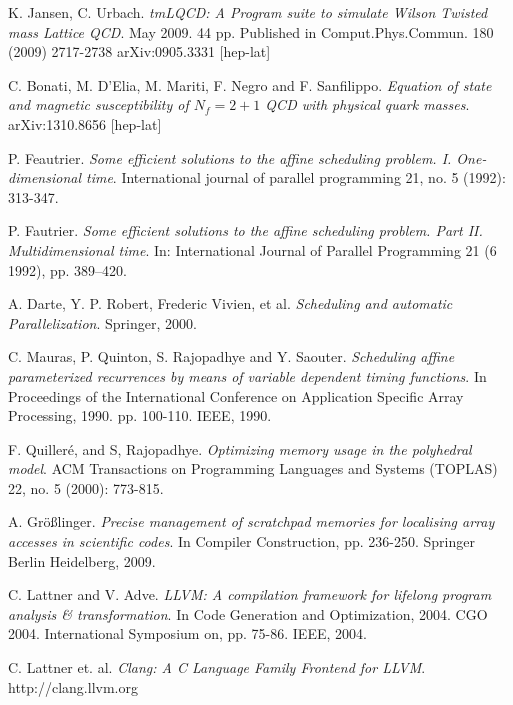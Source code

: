 \documentclass{sigplanconf}
\begin{document}

\begin{thebibliography}
\softraggedright


K. Jansen, C. Urbach. \emph{tmLQCD: A Program suite to simulate Wilson Twisted mass Lattice QCD}. May 2009. 44 pp.
Published in Comput.Phys.Commun. 180 (2009) 2717-2738
arXiv:0905.3331 [hep-lat]

C. Bonati, M. D'Elia, M. Mariti, F. Negro and F. Sanfilippo. \emph{Equation of state and magnetic susceptibility of $N_f = 2 + 1$ QCD with physical quark masses}. arXiv:1310.8656 [hep-lat]




P. Feautrier. \emph{Some efficient solutions to the affine scheduling problem. I. One-dimensional time}. International journal of parallel programming 21, no. 5 (1992): 313-347.

P. Fautrier. \emph{Some efficient solutions to the affine scheduling problem. Part II. Multidimensional time}. In: International Journal of Parallel Programming 21 (6 1992), pp. 389–420.

A. Darte, Y. P. Robert, Frederic Vivien, et al. \emph{Scheduling and automatic Parallelization}. Springer, 2000.


C. Mauras, P. Quinton, S. Rajopadhye and Y. Saouter. \emph{Scheduling affine parameterized recurrences by means of variable dependent timing functions}. In Proceedings of the International Conference on Application Specific Array Processing, 1990. pp. 100-110. IEEE, 1990.

F. Quilleré, and S, Rajopadhye. \emph{Optimizing memory usage in the polyhedral model}. ACM Transactions on Programming Languages and Systems (TOPLAS) 22, no. 5 (2000): 773-815.

A. Gr{\"o}{\ss}linger. \emph{Precise management of scratchpad memories for localising array accesses in scientific codes}. In Compiler Construction, pp. 236-250. Springer Berlin Heidelberg, 2009.


C. Lattner and V. Adve. \emph{LLVM: A compilation framework for lifelong program analysis \& transformation}. In Code Generation and Optimization, 2004. CGO 2004. International Symposium on, pp. 75-86. IEEE, 2004.

C. Lattner et. al. \emph{Clang: A C Language Family Frontend for LLVM}. {http://clang.llvm.org} 





\end{thebibliography}
\end{document}
